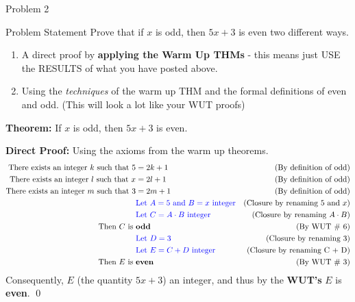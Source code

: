 \begin{problem}{Problem 2}
    \begin{statement}{Problem Statement}
        Prove that if $x$ is odd, then $5x + 3$ is even two different ways.

        \begin{enumerate}[label=(\alph*)]
            \item A direct proof by \textbf{applying the Warm Up THMs} - this means just USE the RESULTS of what you have posted above.
            \item Using the \textit{techniques} of the warm up THM and the formal definitions of even and odd. (This will look a lot like your WUT proofs)
        \end{enumerate}
    \end{statement}

    \begin{Highlight}
        \textbf{Theorem:} If $x$ is odd, then $5x + 3$ is even. \vspace*{1em}

        \textbf{Direct Proof:} Using the axioms from the warm up theorems. \newline
        \begin{align*}
            \text{There exists an integer $k$ such that } 5 & = 2k + 1 & \text{(By definition of odd)} \\
            \text{There exists an integer $l$ such that } x & = 2l + 1 & \text{(By definition of odd)} \\
            \text{There exists an integer $m$ such that } 3 & = 2m + 1 & \text{(By definition of odd)} \\
            & \textcolor{blue}{\text{Let } A = 5 \text { and } B = x \text{ integer}} & \text{(Closure by renaming $5$ and $x$)} \\
            & \textcolor{blue}{\text{Let } C = A \cdot B \text{ integer}} & \text{(Closure by renaming $A \cdot B$)} \\
            \text{Then $C$ is } & \text{\textbf{odd}} & \text{(By WUT \# 6)} \\
            & \textcolor{blue}{\text{Let } D = 3} & \text{(Closure by renaming $3$)} \\
            & \textcolor{blue}{\text{Let } E = C + D \text{ integer}} & \text{(Closure by renaming C + D)} \\
            \text{Then $E$ is } & \text{\textbf{even}} & \text{(By WUT \# 3)} \\
        \end{align*}
        Consequently, $E$ (the quantity $5x + 3$) an integer, and thus by the \textbf{WUT's} $E$ is \textbf{even}. \qed
    \end{Highlight}


\end{problem}
